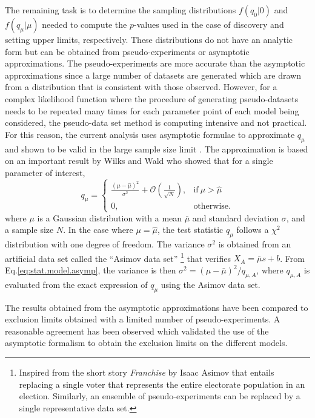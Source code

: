 The remaining task is to determine the sampling distributions
$f\left(q_{0} \rvert 0\right)$ and $f\left(q_{\mu} \rvert \mu\right)$
needed to compute the $p$-values
used in the case of discovery and setting upper limits, respectively.
These distributions do not have an analytic form but can be obtained from 
pseudo-experiments or asymptotic approximations.
The pseudo-experiments are more accurate than the asymptotic 
approximations since a large number of 
datasets are generated which are drawn from a distribution that is consistent 
with those observed.
However, for a complex likelihood function where the procedure of generating 
pseudo-datasets needs to be repeated many times for each parameter point
of each model being considered, the pseudo-data set method is computing 
intensive and not practical. For this reason, the current analysis 
uses asymptotic formulae to approximate $q_{\mu}$ and shown to be valid in the 
large sample size limit \cite{Cowan:2010js}. The approximation is based on an important result 
by Wilks \cite{Wilks:1938dza} and Wald \cite{Wald:ams1943} who showed that for a single parameter of interest,
\begin{equation}
  q_{\mu} =
  \begin{cases}
    \frac{\left(\mu - \hat{\mu}\right)^2}{\sigma^2} + \mathcal{O}\left(\frac{1}{\sqrt{N}}\right)
    , & \text{if}\ \mu > \hat{\mu} \\
    0, & \text{otherwise}.
  \end{cases}
\label{eq:stat.model.asymp}
\end{equation}
where $\mu$ is a Gaussian distribution with a mean $\bar{\mu}$ and 
standard deviation $\sigma$, and a sample size $N$. In the case where 
$\mu = \hat{\mu}$, the test statistic $q_{\mu}$ follows a $\chi^2$ distribution
with one degree of freedom. 
The variance $\sigma^2$ is obtained from an artificial data set called the 
``Asimov data set''
\footnote{Inspired from the short story \textit{Franchise}\cite{asimov} by Isaac Asimov that entails replacing a single voter that represents the entire electorate 
population in an election. Similarly, an ensemble of pseudo-experiments 
can be replaced by a single representative data set.}
 that verifies $X_A = \bar{\mu} s + b$. 
From Eq.\ref{eq:stat.model.asymp}, the variance is then 
$\sigma^2 = \left( \mu - \bar{\mu} \right)^2/q_{\mu,A}$, where $q_{\mu,A}$ 
is evaluated from the exact expression of $q_{\mu}$ using the Asimov data set.

The results obtained from the asymptotic approximations have been compared to 
exclusion limits obtained with a limited number of pseudo-experiments.
A reasonable agreement has been observed which validated the use of 
the asymptotic formalism to obtain the exclusion limits on the different models.
